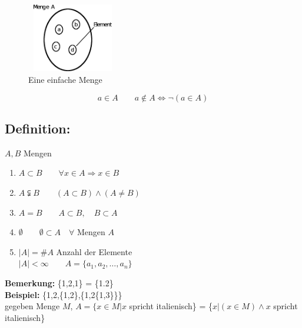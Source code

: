 \begin{figure} [H]
\centering 
\includegraphics[width=4cm, height=3cm]{mainmatter/chapter0/pics/menge.png}
\caption{Eine einfache Menge} 
\end{figure}
\begin{equation*}
a \in A \qquad a \notin A \Leftrightarrow \neg (a \in A)
\end{equation*}
%
\subsection{Definition:}
$A, B$ Mengen 
\begin{enumerate}
\item $A \subset B \qquad \forall x \in A \Rightarrow x \in B$
\item $A \subsetneqq B \qquad (A \subset B) \wedge (A \neq B)$
\item $A = B \qquad A\subset B, \quad B\subset A$
\item $\emptyset \qquad \emptyset \subset A \quad \forall$ Mengen $A$
\item $|A| = \#A$ \qquad Anzahl der Elemente\\
 $|A| < \infty \qquad A=\{a_{1}, a_{2}, \dotsc, a_{n}\}$
\end{enumerate}
%
\textbf{Bemerkung:} \{1,2,1\} = \{1.2\}\\
\textbf{Beispiel:} \{1,2,\{1,2\},\{1,2\{1,3\}\}\}\\
gegeben Menge $M$, \quad $A=\{x \in M|x$ spricht italienisch\} = \{$x|(x \in M) \wedge x$ spricht italienisch\}